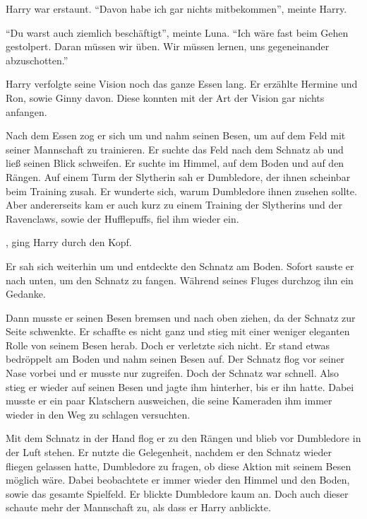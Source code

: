 Harry war erstaunt. \enquote{Davon habe ich gar nichts mitbekommen}, meinte Harry.

\enquote{Du warst auch ziemlich beschäftigt}, meinte Luna. \enquote{Ich wäre fast beim Gehen gestolpert. Daran müssen wir üben. Wir müssen lernen, uns gegeneinander abzuschotten.}

Harry verfolgte seine Vision noch das ganze Essen lang. Er erzählte Hermine und Ron, sowie Ginny davon. Diese konnten mit der Art der Vision gar nichts anfangen.

Nach dem Essen zog er sich um und nahm seinen Besen, um auf dem Feld mit seiner Mannschaft zu trainieren. Er suchte das Feld nach dem Schnatz ab und ließ seinen Blick schweifen. Er suchte im Himmel, auf dem Boden und auf den Rängen. Auf einem Turm der Slytherin sah er Dumbledore, der ihnen scheinbar beim Training zusah. Er wunderte sich, warum Dumbledore ihnen zusehen sollte. Aber andererseits kam er auch kurz zu einem Training der Slytherins und der Ravenclaws, sowie der Hufflepuffs, fiel ihm wieder ein.

, ging Harry durch den Kopf.

Er sah sich weiterhin um und entdeckte den Schnatz am Boden. Sofort sauste er nach unten, um den Schnatz zu fangen. Während seines Fluges durchzog ihn ein Gedanke. 

Dann musste er seinen Besen bremsen und nach oben ziehen, da der Schnatz zur Seite schwenkte. Er schaffte es nicht ganz und stieg mit einer weniger eleganten Rolle von seinem Besen herab. Doch er verletzte sich nicht. Er stand etwas bedröppelt am Boden und nahm seinen Besen auf. Der Schnatz flog vor seiner Nase vorbei und er musste nur zugreifen. Doch der Schnatz war schnell. Also stieg er wieder auf seinen Besen und jagte ihm hinterher, bis er ihn hatte. Dabei musste er ein paar Klatschern ausweichen, die seine Kameraden ihm immer wieder in den Weg zu schlagen versuchten.

Mit dem Schnatz in der Hand flog er zu den Rängen und blieb vor Dumbledore in der Luft stehen. Er nutzte die Gelegenheit, nachdem er den Schnatz wieder fliegen gelassen hatte, Dumbledore zu fragen, ob diese Aktion mit seinem Besen möglich wäre. Dabei beobachtete er immer wieder den Himmel und den Boden, sowie das gesamte Spielfeld. Er blickte Dumbledore kaum an. Doch auch dieser schaute mehr der Mannschaft zu, als dass er Harry anblickte.

